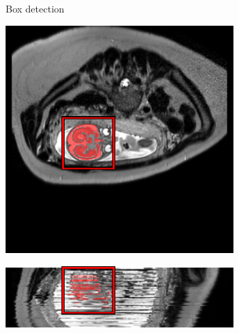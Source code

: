 \documentclass[12pt]{beamer}
\begin{document}
\begin{frame}{Box detection}

\centering

\includegraphics[width=0.65\textwidth,clip=true,trim=0 51 0 0]{maskZ.pdf}

\includegraphics[width=0.65\textwidth]{maskY.pdf}

\end{frame}
\end{document}
